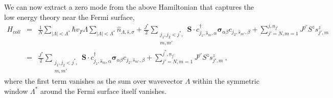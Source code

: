 \documentclass[aps,prb,preprint,groupedaddress]{revtex4-2}
\begin{document}
\par\noindent
We can now extract a zero mode from the above Hamiltonian that captures the low energy theory near the Fermi surface,
\begin{eqnarray}
H_{coll}&=&\frac{1}{N}\sum_{|\Lambda|<\Lambda^{*}}\hbar v_{F}\Lambda\sum_{|\Lambda|<\Lambda^{*}}\hat{n}_{\Lambda,\hat{s},\sigma}+\frac{J^{*}}{2}\sum_{\substack{j_{1},j_{2}<j^{*},\\ m,m'}}\mathbf{S}\cdot c^{\dagger}_{j_{1},\hat{s}_{m},\alpha}\boldsymbol{\sigma}_{\alpha\beta}c_{j_{2},\hat{s}_{m'},\beta}+\sum_{j'=N,m=1}^{j,n_{j'}}J^{j'}S^{z}s^{z}_{j',m}\nonumber\\
		&=&\frac{J^{*}}{2}\sum_{\substack{j_{1},j_{2}<j^{*},\\ m,m'}}\mathbf{S}\cdot c^{\dagger}_{j_{1},\hat{s}_{m},\alpha}\boldsymbol{\sigma}_{\alpha\beta}c_{j_{2},\hat{s}_{m'},\beta}+\sum_{j'=N,m=1}^{j^{*},n_{j'}}J^{j'}S^{z}s^{z}_{j',m}~,
\end{eqnarray}
where the first term vanishes as the sum over wavevector $\Lambda$ within the symmetric window $\Lambda^{*}$ around the Fermi surface itself vanishes.
\end{document}

